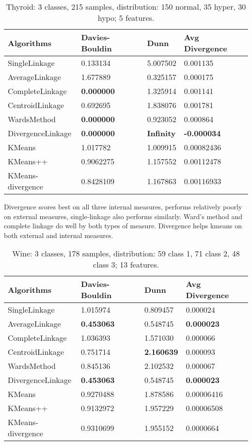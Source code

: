 \begin{table}
\caption{Thyroid: 3 classes, 215 samples, distribution:
	150 normal,
	35 hyper,
	30 hypo;
5 features.}\label{tab:Glass}
\begin{tabularx}{\textwidth}{l@{\hskip 1in}XXl}
\hline
Algorithms			&Davies-Bouldin  	&Dunn			&Avg Divergence\\ 
\hline 
SingleLinkage			&0.133134        		&5.007502			&0.001135\\       
AverageLinkage			&1.677889        		&0.325157			&0.000175\\       
CompleteLinkage		&\textbf{0.000000}	&1.325914			&0.001141\\ 
CentroidLinkage		&0.692695        		&1.838076			&0.001781\\       
WardsMethod			&\textbf{0.000000}	&0.923052 		&0.000864\\       
DivergenceLinkage		&\textbf{0.000000}	&\textbf{Infinity}	&\textbf{-0.000034}\\      
KMeans				&1.017782			&1.009915			&0.00082436\\
KMeans++				&0.9062275		&1.157552			&0.00112478\\
KMeans-divergence		&0.8428109		&1.167863			&0.00116933\\
\hline
\end{tabularx}
\end{table}

Divergence scores best on all three internal measures, performs relatively poorly on external measures, single-linkage also performs similarly.  Ward's method and complete linkage do well by both types of measure.	Divergence helps kmeans on both external and internal measures.

\begin{table}
\caption{Wine: 3 classes, 178 samples, distribution:
	59 class 1,
	71 class 2,
	48 class 3;
13 features.}\label{tab:Wine}
\begin{tabularx}{\textwidth}{l@{\hskip 1in}XXl}
\hline
Algorithms			&Davies-Bouldin	&Dunn			&Avg Divergence\\ 
\hline 
SingleLinkage			&1.015974			&0.809457			&0.000024\\       
AverageLinkage			&\textbf{0.453063}	&0.548745			&\textbf{0.000023}\\       
CompleteLinkage		&1.036393			&1.571030			&0.000066\\
CentroidLinkage		&0.751714			&\textbf{2.160639}	&0.000093\\       
WardsMethod			&0.845136			&2.102532			&0.000067\\       
DivergenceLinkage		&\textbf{0.453063}	&0.548745			&\textbf{0.000023}\\       
KMeans				&0.9270488		&1.878586			&0.00006416\\
KMeans++				&0.9132972		&1.957229			&0.00006508\\
KMeans-divergence		&0.9310699		&1.955152			&0.0000664\\
\hline
\end{tabularx}
\end{table}

